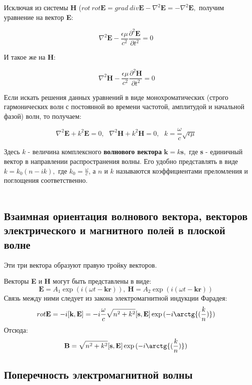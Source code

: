 Исключая из системы \textbf{H} ($rot \ rot \textbf{E}  = grad \ div \textbf{E} - \nabla^2 \textbf{E}  = - \nabla^2 \textbf{E},$ получим уравнение на вектор \textbf{E}: 

$$ {\nabla}^2\textbf{E} - \frac{\epsilon \mu}{c^2} \frac{{\partial}^2 \textbf{E}}{\partial t^2} = 0$$

И такое же на \textbf{H}:

$$ \ {\nabla}^2\textbf{H} - \frac{\epsilon \mu}{c^2} \frac{{\partial}^2 \textbf{H}}{\partial t^2} = 0$$

Если искать решения данных уравнений в виде монохроматических (строго гармонических волн с постоянной во времени частотой, амплитудой и начальной фазой) волн, то получаем:

$$ {\nabla}^2\textbf{E} + k^2 \textbf{E} = 0, \ \ \ {\nabla}^2\textbf{H} + k^2 \textbf{H} = 0, \ \ \ k = \frac{\omega}{c}\sqrt{ \epsilon \mu}$$

Здесь $k$ - величина комплексного \textbf {волнового вектора} $\textbf{k} = k \textbf{s},$ где \textbf{s} - единичный вектор в направлении распространения волны. Его удобно представлять в виде $k = k_0(n -ik),$ где $k_0 = \frac{\omega}{c}$, а $n$ и $k$ называются коэффициентами преломления и поглощения соответственно.\\ \\

\subsection{Взаимная ориентация волнового вектора, векторов электрического и магнитного полей в плоской волне}


Эти три вектора образуют правую тройку векторов.

Векторы \textbf{E} и \textbf{H} могут быть представлены в виде:
$$ \textbf{E} = A_1 \exp{(i(\omega t - \textbf{k}\textbf{r}))}, \ \textbf{H} = A_2 \exp{(i(\omega t - \textbf{k}\textbf{r}))}$$
Связь между ними следует из закона электромагнитной индукции Фарадея:
$$ rot \textbf{E} = - i [\textbf{k}, \textbf{E}] = -i\frac{\omega}{c} \sqrt{n^2 + k^2} [\textbf{s}, \textbf{E}] \exp{(-i \arctg{(\frac{k}{n})})}$$
Отсюда:
$$ \textbf{B} = \sqrt{n^2 + k^2}[\textbf{s}, \textbf{E}] \exp{(-i \arctg{(\frac{k}{n})})}$$


\subsection{Поперечность электромагнитной волны}

